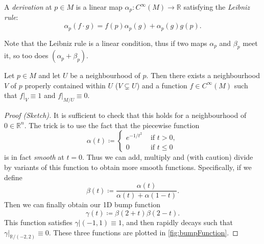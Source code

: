 \documentclass[fleqn, 11pt]{report}
\begin{document}
\begin{definition}[Derivation]
	A \textsl{derivation} at $ p \in M $ is a linear map $ \alpha_p: C^\infty(M) \to \mathbb{R} $ satisfying the \textsl{Leibniz rule}:
		\begin{equation}\label{key}
			\alpha_p(f \cdot g) = f(p)\alpha_p(g) + \alpha_p(g)g(p).
		\end{equation}
\end{definition}
\begin{remark}
	Note that the Leibniz rule is a linear condition, thus if two maps $ \alpha_p $ and $ \beta_p $ meet it, so too does $ (\alpha_p + \beta_p) $.
\end{remark}

\begin{lemma}\label{lem:bumpFunctions}
	Let $ p \in M $ and let $ U $ be a neighbourhood of $ p $. Then there exists a neighbourhood $ V $ of $ p $ properly contained within $ U $ ($ V \subsetneq U $) and a function $ f \in C^\infty(M) $ such that $ f|_V \equiv 1 $ and $ f|_{M/U} \equiv 0 $.
\end{lemma}
\begin{proof}[Proof (Sketch)]
	It is sufficient to check that this holds for a neighbourhood of $ 0 \in \mathbb{R}^n $. The trick is to use the fact that the piecewise function
		\begin{equation}\label{key}
			\alpha(t) \coloneqq \begin{cases}
			e^{-1/t^2} & \text{ if } t>0,\\
			0 & \text{ if } t \leq 0
			\end{cases}
		\end{equation}
	is in fact \textit{smooth} at $ t = 0 $. Thus we can add, multiply and (with caution) divide by variants of this function to obtain more smooth functions. Specifically, if we define
		\begin{equation}\label{key}
			\beta(t) \coloneqq \frac{\alpha(t)}{\alpha(t) + \alpha(1-t)}.
		\end{equation}
	Then we can finally obtain our 1D bump function
		\begin{equation}\label{key}
			\gamma(t) \coloneqq \beta(2+t) \beta(2-t).
		\end{equation}
	This function satisfies $ \gamma|{(-1,1)} \equiv 1 $, and then rapidly decays such that $ \gamma|_{\mathbb{R} / (-2,2)} \equiv 0 $. These three functions are plotted in \autoref{fig:bumpFunction}.
\end{proof}
\end{document}
